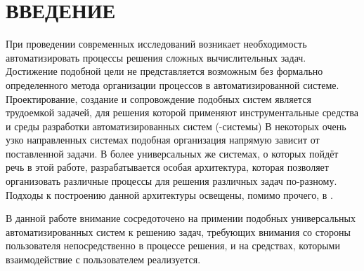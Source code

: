 \chapter*{ВВЕДЕНИЕ}\label{chap.introduction}

При проведении современных исследований возникает необходимость автоматизировать процессы решения сложных вычислительных задач. Достижение подобной цели не представляется возможным без формально определенного метода организации процессов в автоматизированной системе. Проектирование, создание и сопровождение подобных систем является трудоемкой задачей, для решения которой применяют инструментальные средства и среды разработки автоматизированных систем (-системы)\cite{Golubev2020} В некоторых очень узко направленных системах подобная организация напрямую зависит от поставленной задачи. В более универсальных же системах, о которых пойдёт речь в этой работе, разрабатывается особая архитектура, которая позволяет организовать различные процессы для решения различных задач по-разному. Подходы к построению данной архитектуры освещены, помимо прочего, в \cite{SokolovCADCMConcept2020}. 

В данной работе внимание сосредоточено на примении подобных универсальных автоматизированных систем к решению задач, требующих внимания со стороны пользователя непосредственно в процессе решения, и на средствах, которыми взаимодействие с пользователем реализуется.

